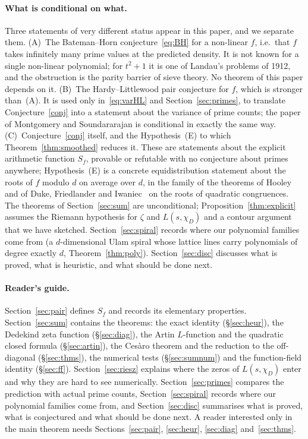 \documentclass[11pt,a4paper]{article}
\theoremstyle{remark}\newtheorem{remark}[theorem]{Remark}
\begin{document}
\paragraph{What is conditional on what.} Three statements of very different status appear in this
paper, and we separate them. (A)~The Bateman--Horn conjecture~\eqref{eq:BH} for a non-linear $f$, i.e.\
that $f$ takes infinitely many prime values at the predicted density. It is not known for a single
non-linear polynomial; for $t^2+1$ it is one of Landau's problems of 1912, and the obstruction is the
parity barrier of sieve theory. No theorem of this paper depends on it. (B)~The Hardy--Littlewood pair
conjecture for $f$, which is stronger than~(A). It is used only in~\eqref{eq:varHL} and
Section~\ref{sec:primes}, to translate Conjecture~\ref{conj} into a statement about the variance of prime
counts; the paper of Montgomery and Soundararajan is conditional in exactly the same way. (C)~Conjecture~\ref{conj}
itself, and the Hypothesis~(E) to which Theorem~\ref{thm:smoothed} reduces it. These are statements about
the explicit arithmetic function $S_f$, provable or refutable with no conjecture about primes anywhere;
Hypothesis~(E) is a concrete equidistribution statement about the roots of $f$ modulo $d$ on average
over $d$, in the family of the theorems of Hooley~\cite{Hooley1963} and of Duke, Friedlander and
Iwaniec~\cite{DFI1995} on the roots of quadratic congruences. The theorems of Section~\ref{sec:sum} are
unconditional; Proposition~\ref{thm:explicit} assumes the Riemann hypothesis for $\zeta$ and
$L(s,\chi_D)$ and a contour argument that we have sketched. Section~\ref{sec:spiral} records where our polynomial families come from (a
$d$-dimensional Ulam spiral whose lattice lines carry polynomials of degree exactly $d$,
Theorem~\ref{thm:poly}). Section~\ref{sec:disc} discusses what is proved, what is heuristic, and what
should be done next.

\paragraph{Reader's guide.} Section~\ref{sec:pair} defines $S_f$ and records its elementary properties.
Section~\ref{sec:sum} contains the theorems: the exact identity (\S\ref{sec:heur}), the Dedekind zeta
function (\S\ref{sec:diag}), the Artin $L$-function and the quadratic closed formula (\S\ref{sec:artin}),
the Ces\`aro theorem and the reduction to the off-diagonal (\S\ref{sec:thms}), the numerical tests
(\S\ref{sec:sumnum}) and the function-field identity (\S\ref{sec:ff}). Section~\ref{sec:riesz} explains where
the zeros of $L(s,\chi_D)$ enter and why they are hard to see numerically. Section~\ref{sec:primes}
compares the prediction with actual prime counts, Section~\ref{sec:spiral} records where our polynomial
families come from, and Section~\ref{sec:disc} summarises what is proved, what is conjectured and what
should be done next. A reader interested only in the main theorem needs Sections~\ref{sec:pair},
\ref{sec:heur}, \ref{sec:diag} and~\ref{sec:thms}.
\end{document}
